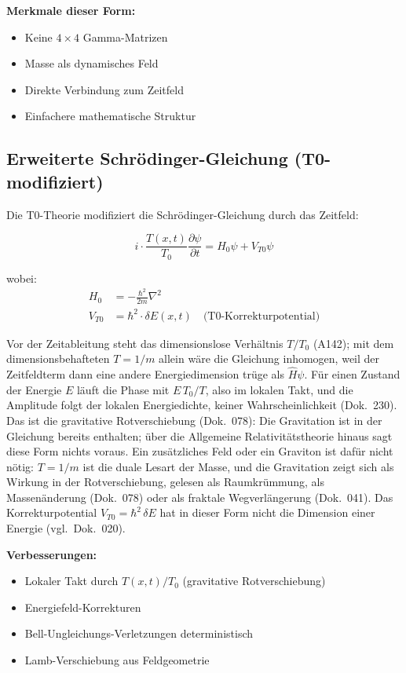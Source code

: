 	\textbf{Merkmale dieser Form:}
	\begin{itemize}
		\item Keine $4 \times 4$ Gamma-Matrizen
		\item Masse als dynamisches Feld
		\item Direkte Verbindung zum Zeitfeld
		\item Einfachere mathematische Struktur
	\end{itemize}
	
	\subsection{Erweiterte Schrödinger-Gleichung (T0-modifiziert)}
	
	Die T0-Theorie modifiziert die Schrödinger-Gleichung durch das Zeitfeld:
	
	\begin{t0box}
		\begin{equation}
			i \cdot \frac{T(x,t)}{T_0} \frac{\partial\psi}{\partial t} = H_0 \psi + V_{T0} \psi
		\end{equation}
		
		wobei:
		\begin{align}
			H_0 &= -\frac{\hbar^2}{2m} \nabla^2 \\
			V_{T0} &= \hbar^2 \cdot \delta E(x,t) \quad \text{(T0-Korrekturpotential)}
		\end{align}
	\end{t0box}
	Vor der Zeitableitung steht das dimensionslose Verhältnis $T/T_0$ (A142); mit dem dimensionsbehafteten $T=1/m$ allein wäre die Gleichung inhomogen, weil der Zeitfeldterm dann eine andere Energiedimension trüge als $\hat H\psi$. Für einen Zustand der Energie $E$ läuft die Phase mit $E\,T_0/T$, also im lokalen Takt, und die Amplitude folgt der lokalen Energiedichte, keiner Wahrscheinlichkeit (Dok.~230). Das ist die gravitative Rotverschiebung (Dok.~078): Die Gravitation ist in der Gleichung bereits enthalten; über die Allgemeine Relativitätstheorie hinaus sagt diese Form nichts voraus. Ein zusätzliches Feld oder ein Graviton ist dafür nicht nötig: $T=1/m$ ist die duale Lesart der Masse, und die Gravitation zeigt sich als Wirkung in der Rotverschiebung, gelesen als Raumkrümmung, als Massenänderung (Dok.~078) oder als fraktale Wegverlängerung (Dok.~041). Das Korrekturpotential $V_{T0}=\hbar^2\,\delta E$ hat in dieser Form nicht die Dimension einer Energie (vgl.\ Dok.~020).
	
	\textbf{Verbesserungen:}
	\begin{itemize}
		\item Lokaler Takt durch $T(x,t)/T_0$ (gravitative Rotverschiebung)
		\item Energiefeld-Korrekturen
		\item Bell-Ungleichungs-Verletzungen deterministisch
		\item Lamb-Verschiebung aus Feldgeometrie
	\end{itemize}
	

